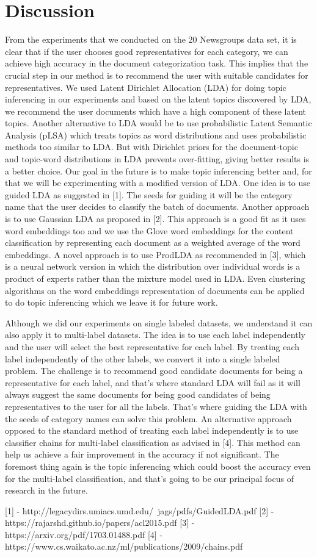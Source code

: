 \section{Discussion}
From the experiments that we conducted on the 20 Newsgroups data set, it is clear that if the user chooses good representatives for each category, we can achieve high accuracy in the document categorization task.  This implies that the crucial step in our method is to recommend the user with suitable candidates for representatives.  We used Latent Dirichlet Allocation (LDA) for doing topic inferencing in our experiments and based on the latent topics discovered by LDA, we recommend the user documents which have a high component of these latent topics.  Another alternative to LDA would be to use probabilistic Latent Semantic Analysis (pLSA) which treats topics as word distributions and uses probabilistic methods too similar to LDA.  But with Dirichlet priors for the document-topic and topic-word distributions in LDA prevents over-fitting, giving better results is a better choice.  Our goal in the future is to make topic inferencing better and, for that we will be experimenting with a modified version of LDA.  One idea is to use guided LDA as suggested in [1].  The seeds for guiding it will be the category name that the user decides to classify the batch of documents.  Another approach is to use Gaussian LDA as proposed in [2].  This approach is a good fit as it uses word embeddings too and we use the Glove word embeddings for the content classification by representing each document as a weighted average of the word embeddings.  A novel approach is to use ProdLDA as recommended in [3], which is a neural network version in which the distribution over individual words is a product of experts rather than the mixture model used in LDA.  Even clustering algorithms on the word embeddings representation of documents can be applied to do topic inferencing which we leave it for future work.

Although we did our experiments on single labeled datasets, we understand it can also apply it to multi-label datasets.  The idea is to use each label independently and the user will select the best representative for each label.  By treating each label independently of the other labels, we convert it into a single labeled problem.  The challenge is to recommend good candidate documents for being a representative for each label, and that's where standard LDA will fail as it will always suggest the same documents for being good candidates of being representatives to the user for all the labels.  That's where guiding the LDA with the seeds of category names can solve this problem.  An alternative approach opposed to the standard method of treating each label independently is to use classifier chains for multi-label classification as advised in [4].  This method can help us achieve a fair improvement in the accuracy if not significant.  The foremost thing again is the topic inferencing which could boost the accuracy even for the multi-label classification, and that's going to be our principal focus of research in the future.

[1] - http://legacydirs.umiacs.umd.edu/~jags/pdfs/GuidedLDA.pdf
[2] - https://rajarshd.github.io/papers/acl2015.pdf
[3] - https://arxiv.org/pdf/1703.01488.pdf
[4] - https://www.cs.waikato.ac.nz/ml/publications/2009/chains.pdf
